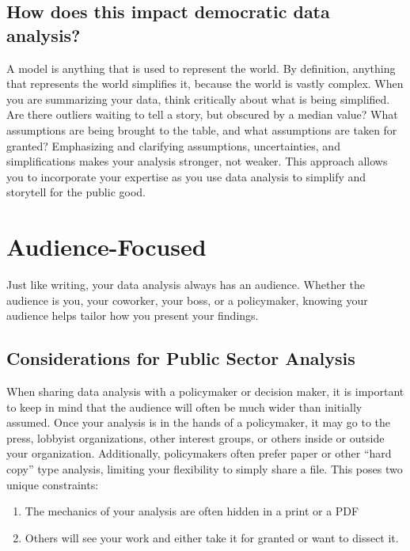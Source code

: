 \documentclass[
]{book}
\providecommand{\tightlist}{%
  \setlength{\itemsep}{0pt}\setlength{\parskip}{0pt}}
\begin{document}
\hypertarget{how-does-this-impact-democratic-data-analysis}{%
\section{How does this impact democratic data analysis?}\label{how-does-this-impact-democratic-data-analysis}}

A model is anything that is used to represent the world. By definition, anything that represents the world simplifies it, because the world is vastly complex. When you are summarizing your data, think critically about what is being simplified. Are there outliers waiting to tell a story, but obscured by a median value? What assumptions are being brought to the table, and what assumptions are taken for granted? Emphasizing and clarifying assumptions, uncertainties, and simplifications makes your analysis stronger, not weaker. This approach allows you to incorporate your expertise as you use data analysis to simplify and storytell for the public good.

\hypertarget{audience-focused}{%
\chapter{Audience-Focused}\label{audience-focused}}

Just like writing, your data analysis always has an audience. Whether the audience is you, your coworker, your boss, or a policymaker, knowing your audience helps tailor how you present your findings.

\hypertarget{considerations-for-public-sector-analysis}{%
\section{Considerations for Public Sector Analysis}\label{considerations-for-public-sector-analysis}}

When sharing data analysis with a policymaker or decision maker, it is important to keep in mind that the audience will often be much wider than initially assumed. Once your analysis is in the hands of a policymaker, it may go to the press, lobbyist organizations, other interest groups, or others inside or outside your organization. Additionally, policymakers often prefer paper or other ``hard copy'' type analysis, limiting your flexibility to simply share a file. This poses two unique constraints:

\begin{enumerate}
\def\labelenumi{\arabic{enumi})}
\tightlist
\item
  The mechanics of your analysis are often hidden in a print or a PDF
\item
  Others will see your work and either take it for granted or want to dissect it.
\end{enumerate}
\end{document}
